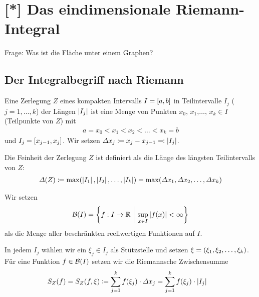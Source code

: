 \section{[*] Das eindimensionale Riemann-Integral}
\thispagestyle{pagenumberonly}

\marginnote{[16. Apr]}
Frage: Was ist die Fläche unter einem Graphen?


\subsection{Der Integralbegriff nach Riemann}

\begin{definition}[Zerlegung]
    Eine Zerlegung $Z$ eines kompakten Intervalls $I=\left[a,b\right]$ in Teilintervalle $I_j$ ($j=1,\dots, k$) der Längen $\left\lvert I_j\right\rvert$ ist eine Menge von Punkten $x_0$, $x_1$,$\dots$, $x_k\in I$ (Teilpunkte von $Z$) mit
    \begin{align*}
        a=x_0 < x_1 < x_2 < \dots < x_k = b
    \end{align*}
    und $I_j = \left[x_{j-1}, x_j\right]$. Wir setzen $\varDelta x_j \coloneqq x_j - x_{j-1} \eqqcolon\left\lvert I_j\right\rvert$.
\end{definition}

\begin{definition}
    Die Feinheit der Zerlegung $Z$ ist definiert als die Länge des längsten Teilintervalls von $Z$:
    \begin{align*}
        \varDelta\of{Z}\coloneqq \max\of{\abs{I_1}, \abs{I_2}, \dots, \abs{I_k}} = \max\of{\varDelta x_1, \varDelta x_2, \dots, \varDelta x_k}
    \end{align*}
\end{definition}

\begin{notation}
    Wir setzen
    \begin{align*}
        \mB\of{I} = \set{f: I\fromto \R~\middle\vert~\sup_{x\in I} \abs{f(x)} < \infty}
    \end{align*}
    als die Menge aller beschränkten reellwertigen Funktionen auf $I$.
\end{notation}

\begin{definition}
    In jedem $I_j$ wählen wir ein $\xi_j\in I_j$ als Stützstelle und setzen $\xi=\left(\xi_1, \xi_2, \dots, \xi_k\right)$. Für eine Funktion $f\in \mB\of{I}$ setzen wir die Riemannsche Zwischensumme
    \begin{align*}
        S_Z\of{f} &= S_Z\of{f, \xi} \coloneqq \sum_{j=1}^{k} f\of{\xi_j}\cdot\varDelta x_j = \sum_{j=1}^{k} f\of{\xi_j}\cdot\abs{I_j}
    \end{align*}
\end{definition}

